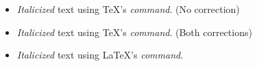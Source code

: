 \documentclass{article}
\begin{document}
\begin{itemize}
  \item {\it Italicized} text using \TeX's {\it command}. (No correction)
  \item {\it Italicized\/} text using \TeX's {\it command\/}. (Both corrections)
  \item \textit{Italicized} text using \LaTeX's \textit{command}.
\end{itemize}
\end{document}

